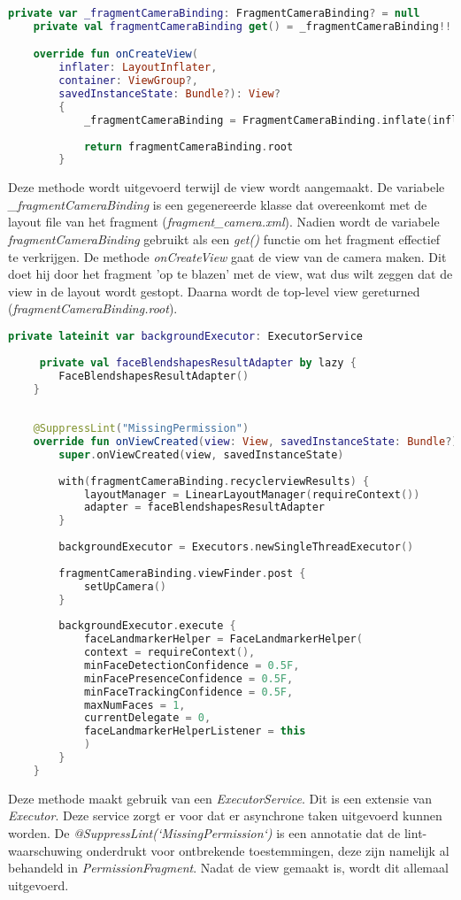 \begin{lstlisting}[language=Kotlin, caption=onCreateView in CameraFragment.kt]
    private var _fragmentCameraBinding: FragmentCameraBinding? = null
    private val fragmentCameraBinding get() = _fragmentCameraBinding!!

    override fun onCreateView(
        inflater: LayoutInflater,
        container: ViewGroup?,
        savedInstanceState: Bundle?): View?
        {
            _fragmentCameraBinding = FragmentCameraBinding.inflate(inflater,container,false)
    
            return fragmentCameraBinding.root
        }
\end{lstlisting}
Deze methode wordt uitgevoerd terwijl de view wordt aangemaakt. De variabele \emph{\_fragmentCameraBinding} is een gegenereerde klasse dat overeenkomt met de layout file van het fragment (\emph{fragment\_camera.xml}). Nadien wordt de variabele \emph{fragmentCameraBinding} gebruikt als een \emph{get()} functie om het fragment effectief te verkrijgen. De methode \emph{onCreateView} gaat de view van de camera maken. Dit doet hij door het fragment 'op te blazen' met de view, wat dus wilt zeggen dat de view in de layout wordt gestopt. Daarna wordt de top-level view gereturned (\emph{fragmentCameraBinding.root}).

\begin{lstlisting}[language=Kotlin, caption=onViewCreated in CameraFragment.kt]
    private lateinit var backgroundExecutor: ExecutorService
    
     private val faceBlendshapesResultAdapter by lazy {
        FaceBlendshapesResultAdapter()
    }
    
    
    @SuppressLint("MissingPermission")
    override fun onViewCreated(view: View, savedInstanceState: Bundle?) {
        super.onViewCreated(view, savedInstanceState)
        
        with(fragmentCameraBinding.recyclerviewResults) {
            layoutManager = LinearLayoutManager(requireContext())
            adapter = faceBlendshapesResultAdapter
        }
        
        backgroundExecutor = Executors.newSingleThreadExecutor()
        
        fragmentCameraBinding.viewFinder.post {
            setUpCamera()
        }
        
        backgroundExecutor.execute {
            faceLandmarkerHelper = FaceLandmarkerHelper(
            context = requireContext(),
            minFaceDetectionConfidence = 0.5F,
            minFacePresenceConfidence = 0.5F,
            minFaceTrackingConfidence = 0.5F,
            maxNumFaces = 1,
            currentDelegate = 0,
            faceLandmarkerHelperListener = this
            )
        }
    }
\end{lstlisting}
Deze methode maakt gebruik van een \emph{ExecutorService}. Dit is een extensie van \emph{Executor}. Deze service zorgt er voor dat er asynchrone taken uitgevoerd kunnen worden. De \emph{@SuppressLint(`MissingPermission`)} is een annotatie dat de lint-waarschuwing onderdrukt voor ontbrekende toestemmingen, deze zijn namelijk al behandeld in \emph{PermissionFragment}. Nadat de view gemaakt is, wordt dit allemaal uitgevoerd.

